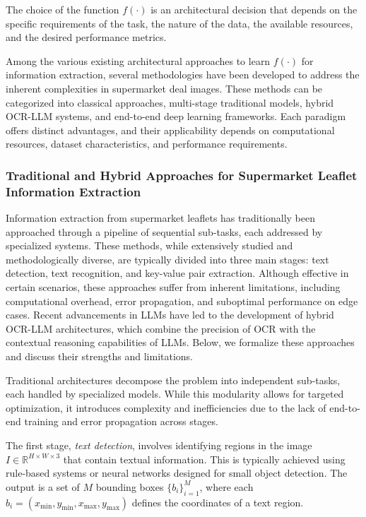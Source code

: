 \documentclass[11pt]{article}
\begin{document}
The choice of the function $ f(\cdot) $ is an architectural decision that depends on the specific requirements of the task, the nature of the data, the available resources, and the desired performance metrics. 

Among the various existing architectural approaches to learn $ f(\cdot) $ for information extraction, several methodologies have been developed to address the inherent complexities in supermarket deal images. These methods can be categorized into classical approaches, multi-stage traditional models, hybrid OCR-LLM systems, and end-to-end deep learning frameworks. Each paradigm offers distinct advantages, and their applicability depends on computational resources, dataset characteristics, and performance requirements.

\subsubsection{Traditional and Hybrid Approaches for Supermarket Leaflet Information Extraction}  
Information extraction from supermarket leaflets has traditionally been approached through a pipeline of sequential sub-tasks, each addressed by specialized systems. These methods, while extensively studied and methodologically diverse, are typically divided into three main stages: text detection, text recognition, and key-value pair extraction. Although effective in certain scenarios, these approaches suffer from inherent limitations, including computational overhead, error propagation, and suboptimal performance on edge cases. Recent advancements in LLMs have led to the development of hybrid OCR-LLM architectures, which combine the precision of OCR with the contextual reasoning capabilities of LLMs. Below, we formalize these approaches and discuss their strengths and limitations.

Traditional architectures decompose the problem into independent sub-tasks, each handled by specialized models. While this modularity allows for targeted optimization, it introduces complexity and inefficiencies due to the lack of end-to-end training and error propagation across stages.

The first stage, \emph{text detection}, involves identifying regions in the image $ I \in \mathbb{R}^{H \times W \times 3} $ that contain textual information. This is typically achieved using rule-based systems or neural networks designed for small object detection. The output is a set of $ M $ bounding boxes $ \{b_i\}_{i=1}^{M} $, where each $ b_i = (x_{\text{min}}, y_{\text{min}}, x_{\text{max}}, y_{\text{max}}) $ defines the coordinates of a text region. 
\end{document}
